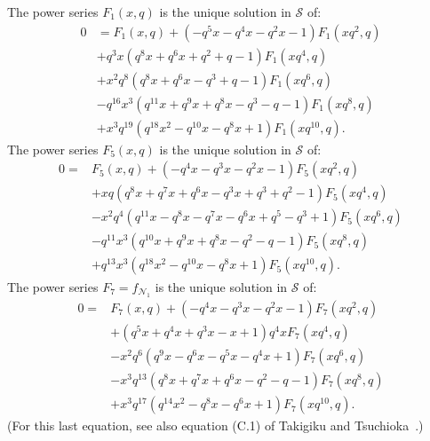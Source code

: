 \documentclass[ALCO,Unicode,published]{cedram}
\newcommand{\sN}{\mathscr{N}}
\newcommand{\sS}{\mathscr{S}}
\begin{document}
\begin{prop}
\label{prop:diffeq}
The power series $F_1(x,q)$ is the unique solution in $\sS$ of:
\begin{align}
    0&=F_1(x,q)  
    +(-q^5x-q^4x-q^2x-1)F_1(xq^2,q) 
    \nonumber\\
    &+q^3x(q^8x+q^6x+q^2+q-1)F_1(xq^4,q)
    \nonumber\\
    &+x^2q^8(q^8x+q^6x-q^3+q-1)F_1(xq^6,q)\nonumber\\
    &-q^{16}x^3(q^{11}x+q^9x+q^8x-q^3-q-1)F_1(xq^8,q)
    \nonumber\\
    &+x^3q^{19}(q^{18}x^2-q^{10}x-q^8x+1)F_1(xq^{10},q)
    \label{eqn:recF1}.
\end{align}
The power series $F_5(x,q)$ is the unique solution in $\sS$ of:
\begin{align}
    0 =&  
    F_5(x,q)
    +(-q^4x-q^3x-q^2x-1)F_5(xq^2,q)
    \nonumber\\
    &+xq(q^8x+q^7x+q^6x-q^3x+q^3+q^2-1)F_5(xq^4,q)
    \nonumber\\
    &-x^2q^4(q^{11}x-q^8x-q^7x-q^6x+q^5-q^3+1)F_5(xq^6,q)
    \nonumber\\
    &-q^{11}x^3(q^{10}x+q^9x+q^8x-q^2-q-1)F_5(xq^8,q)
    \nonumber\\
    &+q^{13}x^3(q^{18}x^2-q^{10}x-q^8x+1)F_5(xq^{10},q)
    \label{eqn:recF5}.
\end{align}
The power series $F_7=f_{\sN_1}$ is the unique solution in $\sS$ of:
\begin{align}
    0 =&  
    F_7(x,q)
	+(-q^4x-q^3x-q^2x-1)F_7(xq^2,q)
	\nonumber\\
	&+(q^5x+q^4x+q^3x-x+1)q^4xF_7(xq^4,q)
	\nonumber\\
	&
	-x^2q^6(q^9x-q^6x-q^5x-q^4x+1)F_7(xq^6,q)
	\nonumber\\
	&-x^3q^{13}(q^8x+q^7x+q^6x-q^2-q-1)F_7(xq^8,q)
	\nonumber\\
	&
	+x^3q^{17}(q^{14}x^2-q^8x-q^6x+1)F_7(xq^{10},q)
    \label{eqn:recF7}.
\end{align}
\textup{(}For this last equation, see also equation (C.1) of Takigiku and Tsuchioka~\cite{TakTsu-nandi}.\textup{)}
\end{prop}
\end{document}

